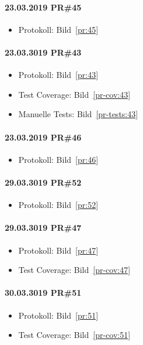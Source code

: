 \documentclass[accentcolor=tud0b,12pt,paper=a4]{tudreport}
\begin{document}
\paragraph{23.03.2019 PR\#45}
\begin{itemize}
\item Protokoll: Bild~\ref{pr:45}
\end{itemize}

\paragraph{23.03.3019 PR\#43}
\begin{itemize}
\item Protokoll: Bild~\ref{pr:43}
\item Test Coverage: Bild~\ref{pr-cov:43}
\item Manuelle Tests: Bild~\ref{pr-tests:43}
\end{itemize}

\paragraph{23.03.2019 PR\#46}
\begin{itemize}
\item Protokoll: Bild~\ref{pr:46}
\end{itemize}

\paragraph{29.03.3019 PR\#52}
\begin{itemize}
\item Protokoll: Bild~\ref{pr:52}
\end{itemize}

\paragraph{29.03.3019 PR\#47}
\begin{itemize}
\item Protokoll: Bild~\ref{pr:47}
\item Test Coverage: Bild~\ref{pr-cov:47}
\end{itemize}

\paragraph{30.03.3019 PR\#51}
\begin{itemize}
\item Protokoll: Bild~\ref{pr:51}
\item Test Coverage: Bild~\ref{pr-cov:51}
\end{itemize}
\end{document}
